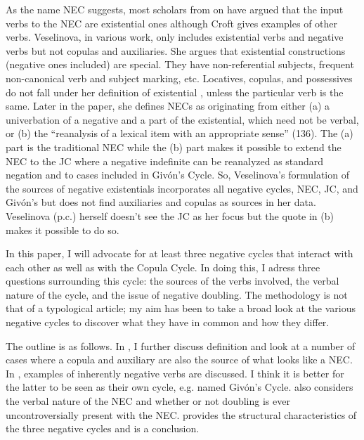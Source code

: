 ﻿\documentclass[output=paper]{langsci/langscibook}
\begin{document}
As the name NEC suggests, most scholars from \citet{Croft1991} on have
argued that the input verbs to the NEC are existential ones although Croft
gives examples of other verbs. Veselinova, in various work, only includes
existential verbs and negative verbs but not copulas and auxiliaries. She
argues that existential constructions (negative ones included) are special.
They have non-referential subjects, frequent non-canonical verb and subject
marking, etc. Locatives, copulas, and possessives do not fall under her
definition of existential \citep[108--11]{Veselinova2013}, unless the
particular verb is the same. Later in the paper, she defines NECs as
originating from either (a) a univerbation of a negative and a part of the
existential, which need not be verbal, or (b) the ``reanalysis of a lexical
item with an appropriate sense'' (136). The (a) part is the
traditional NEC while the (b) part makes it possible to extend the NEC to
the JC where a negative indefinite can be reanalyzed as standard negation
and to cases included in Givón's Cycle. So, Veselinova's formulation of the
sources of negative existentials incorporates all negative cycles, NEC, JC,
and Givón's but does not find auxiliaries and copulas as sources in her
data. Veselinova (p.c.) herself doesn't see the JC as her focus but the
quote in (b) makes it possible to do so.

In this paper, I will advocate for at least three negative cycles that
interact with each other as well as with the Copula Cycle. In doing this, I
adress three questions surrounding this cycle: the sources of the verbs
involved, the verbal nature of the cycle, and the issue of negative
doubling. The methodology is not that of a typological article; my aim has
been to take a broad look at the various negative cycles to discover what
they have in common and how they differ.

The outline is as follows. In , I further discuss
 definition and look at a number of cases where a
copula and auxiliary are also the source of what looks like a NEC. In
,  examples of inherently negative verbs are
discussed. I think it is better for the latter to be seen as their own
cycle, e.g. named Givón's Cycle.  also considers the
verbal nature of the NEC and  whether or not doubling is ever
uncontroversially present with the NEC.  provides the
structural characteristics of the three negative cycles and
 is a
conclusion.
\end{document}
